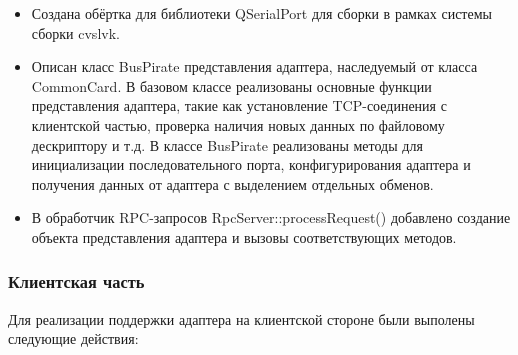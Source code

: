 \begin{itemize}
 \item Создана обёртка для библиотеки QSerialPort для сборки в рамках системы сборки cvslvk.
 \item Описан класс BusPirate представления адаптера, наследуемый от класса CommonCard. В базовом классе реализованы основные функции представления адаптера, такие как установление TCP-соединения с клиентской частью, проверка наличия новых данных по файловому дескриптору и т.д. В классе BusPirate реализованы методы для инициализации последовательного порта, конфигурирования адаптера и получения данных от адаптера с выделением отдельных обменов.
 \item В обработчик RPC-запросов RpcServer::processRequest() добавлено создание объекта представления адаптера и вызовы соответствующих методов.
\end{itemize}


\subsubsection{Клиентская часть}

\label{client_implementation}

Для реализации поддержки адаптера на клиентской стороне были выполены следующие действия:


